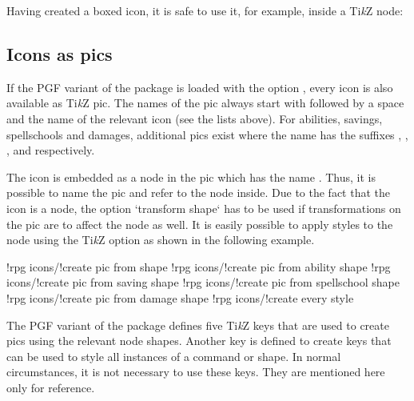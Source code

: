 \documentclass[a4paper]{article}
\begin{document}
Having created a boxed icon, it is safe to use it, for example, inside a Ti\emph{k}Z node:

\begin{codeexample}
\end{codeexample}


\subsection{Icons as pics}\label{sec:pics}

If the PGF variant of the package is loaded with the option , every icon is also available as Ti\emph{k}Z pic. The names of the pic always start with  followed by a space and the name of the relevant icon (see the lists above). For abilities, savings, spellschools and damages, additional pics exist where the name has the suffixes , , , and  respectively.

The icon is embedded as a node in the pic which has the name . Thus, it is possible to name the pic and refer to the node inside. Due to the fact that the icon is a node, the option `transform shape` has to be used if transformations on the pic are to affect the node as well. It is easily possible to apply styles to the node using the Ti\emph{k}Z option  as shown in the following example.

\begin{codeexample}
\end{codeexample}

\begin{macrodef}
!rpg icons/!create pic from shape
!rpg icons/!create pic from ability shape
!rpg icons/!create pic from saving shape 
!rpg icons/!create pic from spellschool shape
!rpg icons/!create pic from damage shape
!rpg icons/!create every style
\end{macrodef}
The PGF variant of the package defines five Ti\emph{k}Z keys that are used to create pics using the relevant node shapes. Another key is defined to create keys that can be used to style all instances of a command or shape. In normal circumstances, it is not necessary to use these keys. They are mentioned here only for reference. 
\end{document}
